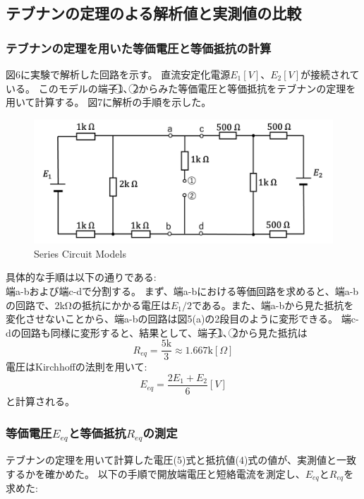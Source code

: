 \documentclass[a4paper,10pt]{jsarticle}
\begin{document}
\begin{multicols}{2}
\subsection{テブナンの定理のよる解析値と実測値の比較}
\subsubsection{テブナンの定理を用いた等価電圧と等価抵抗の計算}
図6に実験で解析した回路を示す。
直流安定化電源$E_1[V]$、$E_2[V]$が接続されている。
このモデルの端子\textcircled{1}、\textcircled{2}からみた等価電圧と等価抵抗をテブナンの定理を用いて計算する。
図7に解析の手順を示した。
\begin{figure}[H]
  \centering
  \includegraphics[width=1\linewidth]{figs/circuit_tebnan.pdf}
  \caption{Series Circuit Models}
  \label{fig:tebunan_circuit}
\end{figure}
具体的な手順は以下の通りである:\\
端a-bおよび端c-dで分割する。
まず、端a-bにおける等価回路を求めると、端a-bの回路で、2kΩの抵抗にかかる電圧は$E_1/2$である。また、端a-bから見た抵抗を変化させないことから、端a-bの回路は図5(a)の2段目のように変形できる。
端c-dの回路も同様に変形すると、結果として、端子\textcircled{1}、\textcircled{2}から見た抵抗は
\begin{equation}
R_{eq}=\frac{5\text{k}}{3}\approx 1.667\text{k}[\Omega]
\end{equation}
電圧はKirchhoffの法則を用いて:
\begin{equation}
E_{eq}=\frac{2E_1+E_2}{6} [V]
\end{equation}
と計算される。
\subsubsection{等価電圧$E_{eq}$と等価抵抗$R_{eq}$の測定}
テブナンの定理を用いて計算した電圧(5)式と抵抗値(4)式の値が、実測値と一致するかを確かめた。
以下の手順で開放端電圧と短絡電流を測定し、$E_{eq}$と$R_{eq}$を求めた:


\end{multicols}
\end{document}
